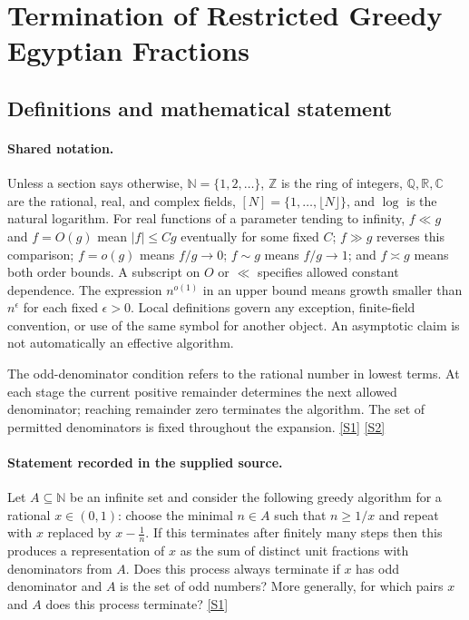 \documentclass[11pt,a4paper]{article}
\newcommand{\N}{\mathbb{N}}
\newcommand{\Z}{\mathbb{Z}}
\newcommand{\Q}{\mathbb{Q}}
\newcommand{\R}{\mathbb{R}}
\newcommand{\C}{\mathbb{C}}
\newcommand{\sref}[2]{\hyperlink{source:#1:#2}{[S#2]}}
\begin{document}
\section{Termination of Restricted Greedy Egyptian Fractions}\label{statement}


\subsection{Definitions and mathematical statement}

\paragraph{Shared notation.}Unless a section says otherwise, $\N=\{1,2,\ldots\}$,
$\Z$ is the ring of integers, $\Q,\R,\C$ are the rational, real, and complex
fields, $[N]=\{1,\ldots,\lfloor N\rfloor\}$, and $\log$ is the natural
logarithm. For real functions of a parameter tending to infinity,
$f\ll g$ and $f=O(g)$ mean $|f|\leq Cg$ eventually for some fixed $C$;
$f\gg g$ reverses this comparison; $f=o(g)$ means $f/g\to0$;
$f\sim g$ means $f/g\to1$; and $f\asymp g$ means both order bounds.
A subscript on $O$ or $\ll$ specifies allowed constant dependence.
The expression $n^{o(1)}$ in an upper bound means growth smaller than
$n^\epsilon$ for each fixed $\epsilon>0$. Local definitions govern any
exception, finite-field convention, or use of the same symbol for another
object. An asymptotic claim is not automatically an effective algorithm.



The odd-denominator condition refers to the rational number in lowest terms. At each stage the current positive remainder determines the next allowed denominator; reaching remainder zero terminates the algorithm. The set of permitted denominators is fixed throughout the expansion. \sref{statement}{1} \sref{statement}{2}

\paragraph{Statement recorded in the supplied source.}
Let $A\subseteq \mathbb{N}$ be an infinite set and consider the following greedy algorithm for a rational $x\in (0,1)$: choose the minimal $n\in A$ such that $n\geq 1/x$ and repeat with $x$ replaced by $x-\frac{1}{n}$. If this terminates after finitely many steps then this produces a representation of $x$ as the sum of distinct unit fractions with denominators from $A$.
Does this process always terminate if $x$ has odd denominator and $A$ is the set of odd numbers? More generally, for which pairs $x$ and $A$ does this process terminate? \sref{statement}{1}
\end{document}
